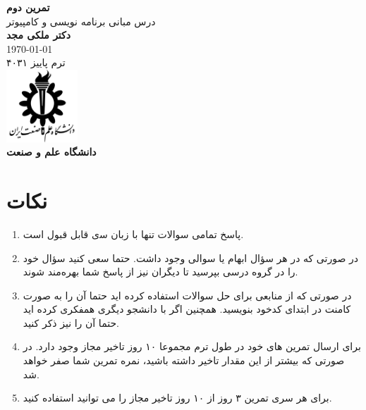 \documentclass{article}
\begin{document}
\begin{titlepage}

    \centering

    \vspace*{2cm}
    {\Huge \textbf{تمرین دوم}} \\[1cm]
    
    {\LARGE درس مبانی برنامه نویسی و کامپیوتر} \\[2cm]
    
    {\Large \textbf{دکتر ملکی مجد}} \\[0.5cm]
    
    {\large \today} \\[4cm]
    
    {\large ترم پاییز ۴۰۳۱} \\[2cm]
    
    \includegraphics[width=0.2\textwidth]{iustlogo.png} \\[0.2cm]
    \textbf{دانشگاه علم و صنعت}
    
\end{titlepage}

\section{نکات}
\begin{enumerate}
    \item  پاﺳﺦ ﺗﻤﺎمی ﺳﻮاﻻت ﺗﻨﻬﺎ ﺑﺎ زﺑﺎن ﺳی ﻗﺎﺑﻞ ﻗﺒﻮل اﺳﺖ.
    \item در صورتی که در هر سؤال ابهام یا سوالی وجود داشت. حتما سعی کنید سؤال خود را
    در گروه درسی بپرسید تا دیگران نیز از پاسخ شما بهره‌مند شوند.
    \item در صورتی که از منابعی برای حل سوالات استفاده کرده اید حتما آن را به صورت کامنت
    در ابتدای کدخود بنویسید. همچنین اگر با دانشجو دیگری همفکری کرده اید حتما آن
    را نیز ذکر کنید.
    \item برای ارسال تمرین های خود در طول ترم مجموعا ۱۰ روز تاخیر مجاز وجود دارد. در
    صورتی که بیشتر از این مقدار تاخیر داشته باشید، نمره تمرین شما صفر خواهد شد.
    \item برای هر سری تمرین ۳ روز از ۱۰ روز تاخیر مجاز را می توانید استفاده کنید.
\end{enumerate}
\end{document}
